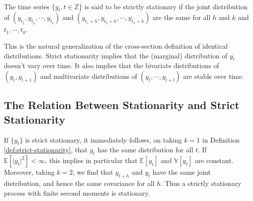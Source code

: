 

\begin{definition}\label{def:strict-stationarity}
    \

    The time series $\{y_t, t \in \mathbb{Z}\}$ is said to be strictly stationary if the joint distribution of $(y_{t_1}, y_{t_2}, \cdots, y_{t_k})$
    and $(y_{t_1+h}, y_{t_2+h}, \cdots, y_{t_k+h})$ are the same for all $h$ and $k$ and $t_1, \cdots, t_k$.
\end{definition}
This is the natural generalization of the cross-section definition of identical distributions.
Strict stationarity implies that the (marginal) distribution of $y_t$ doesn't vary over time.
It also implies that the bivariate distributions of $(y_t, y_{t+1})$ and multivariate distributions of $(y_t, \cdots, y_{t+l})$
are stable over time.

\subsection*{The Relation Between Stationarity and Strict Stationarity}

If $\{y_t\}$ is strict stationary, it immediately follows, on taking $k=1$ in Definition \ref{def:strict-stationarity}, 
that $y_t$ has the same distribution for all $t$. If $\mathbb{E}[\vert y_t \vert ^2] < \infty $,
this implies in particular that $\mathbb{E}[y_t]$ and $\mathbb{V}[y_t]$ are constant.
Moreover, taking $k=2$, we find that $y_{t+h}$ and $y_t$ have the same joint distribution,
and hence the same covariance for all $h$. 
Thus a strictly stationary process with finite second moments is stationary.


